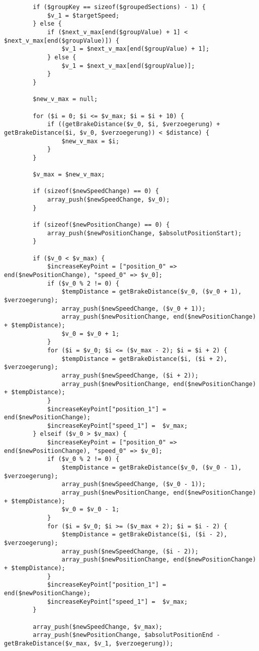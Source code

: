 \begin{lstlisting}
		if ($groupKey == sizeof($groupedSections) - 1) {
			$v_1 = $targetSpeed;
		} else {
			if ($next_v_max[end($groupValue) + 1] < $next_v_max[end($groupValue)]) {
				$v_1 = $next_v_max[end($groupValue) + 1];
			} else {
				$v_1 = $next_v_max[end($groupValue)];
			}
		}

		$new_v_max = null;

		for ($i = 0; $i <= $v_max; $i = $i + 10) {
			if ((getBrakeDistance($v_0, $i, $verzoegerung) + getBrakeDistance($i, $v_0, $verzoegerung)) < $distance) {
				$new_v_max = $i;
			}
		}

		$v_max = $new_v_max;

		if (sizeof($newSpeedChange) == 0) {
			array_push($newSpeedChange, $v_0);
		}

		if (sizeof($newPositionChange) == 0) {
			array_push($newPositionChange, $absolutPositionStart);
		}

		if ($v_0 < $v_max) {
			$increaseKeyPoint = ["position_0" => end($newPositionChange), "speed_0" => $v_0];
			if ($v_0 % 2 != 0) {
				$tempDistance = getBrakeDistance($v_0, ($v_0 + 1), $verzoegerung);
				array_push($newSpeedChange, ($v_0 + 1));
				array_push($newPositionChange, end($newPositionChange) + $tempDistance);
				$v_0 = $v_0 + 1;
			}
			for ($i = $v_0; $i <= ($v_max - 2); $i = $i + 2) {
				$tempDistance = getBrakeDistance($i, ($i + 2), $verzoegerung);
				array_push($newSpeedChange, ($i + 2));
				array_push($newPositionChange, end($newPositionChange) + $tempDistance);
			}
			$increaseKeyPoint["position_1"] =  end($newPositionChange);
			$increaseKeyPoint["speed_1"] =  $v_max;
		} elseif ($v_0 > $v_max) {
			$increaseKeyPoint = ["position_0" => end($newPositionChange), "speed_0" => $v_0];
			if ($v_0 % 2 != 0) {
				$tempDistance = getBrakeDistance($v_0, ($v_0 - 1), $verzoegerung);
				array_push($newSpeedChange, ($v_0 - 1));
				array_push($newPositionChange, end($newPositionChange) + $tempDistance);
				$v_0 = $v_0 - 1;
			}
			for ($i = $v_0; $i >= ($v_max + 2); $i = $i - 2) {
				$tempDistance = getBrakeDistance($i, ($i - 2), $verzoegerung);
				array_push($newSpeedChange, ($i - 2));
				array_push($newPositionChange, end($newPositionChange) + $tempDistance);
			}
			$increaseKeyPoint["position_1"] =  end($newPositionChange);
			$increaseKeyPoint["speed_1"] =  $v_max;
		}

		array_push($newSpeedChange, $v_max);
		array_push($newPositionChange, $absolutPositionEnd - getBrakeDistance($v_max, $v_1, $verzoegerung));


\end{lstlisting}
